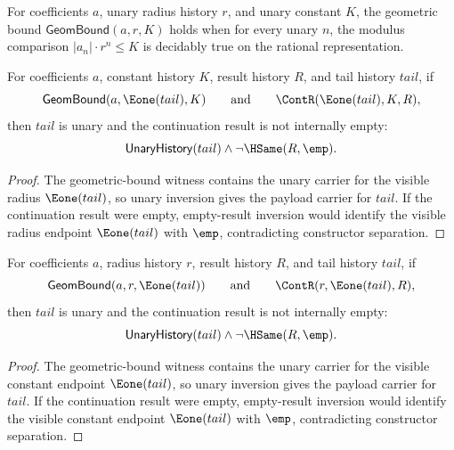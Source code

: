 \begin{definition}
\label{def:geom-bound}
For coefficients \(a\), unary radius history \(r\), and unary constant \(K\), the geometric bound \(\mathsf{GeomBound}(a, r, K)\) holds when for every unary \(n\), the modulus comparison \(|a_n| \cdot r^n \leq K\) is decidably true on the rational representation.
\end{definition}

\begin{lemma}
\label{lem:geom-bound-visible-radius-endpoint-package}
For coefficients $a$, constant history $K$, result history $R$, and tail
history $tail$, if
$$
\mathsf{GeomBound}(a,\Eone(tail),K)
\qquad\text{and}\qquad
\ContR(\Eone(tail),K,R),
$$
then $tail$ is unary and the continuation result is not internally empty:
$$
\mathsf{UnaryHistory}(tail)\land \neg\HSame(R,\emp).
$$
\end{lemma}
\begin{proof}
The geometric-bound witness contains the unary carrier for the visible radius
$\Eone(tail)$, so unary inversion gives the payload carrier for $tail$. If the
continuation result were empty, empty-result inversion would identify the
visible radius endpoint $\Eone(tail)$ with $\emp$, contradicting constructor
separation.
\end{proof}

\begin{theorem}
\label{thm:geom-bound-visible-constant-endpoint-package}
For coefficients $a$, radius history $r$, result history $R$, and tail
history $tail$, if
$$
\mathsf{GeomBound}(a,r,\Eone(tail))
\qquad\text{and}\qquad
\ContR(r,\Eone(tail),R),
$$
then $tail$ is unary and the continuation result is not internally empty:
$$
\mathsf{UnaryHistory}(tail)\land \neg\HSame(R,\emp).
$$
\end{theorem}
\begin{proof}
The geometric-bound witness contains the unary carrier for the visible constant
endpoint $\Eone(tail)$, so unary inversion gives the payload carrier for
$tail$. If the continuation result were empty, empty-result inversion would
identify the visible constant endpoint $\Eone(tail)$ with $\emp$,
contradicting constructor separation.
\end{proof}


